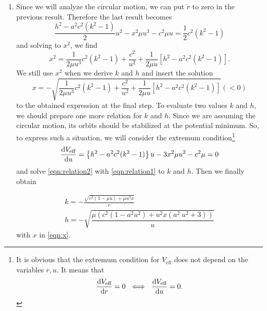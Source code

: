 \documentclass[a4paper,pdftex,10pt]{article}
\begin{document}
\begin{enumerate}
  \item
        Since we will analyze the circular motion, we can put $\dot{r}$ to zero in the previous result. Therefore the last result becomes
        \begin{equation}
          \frac{h^2-a^2c^2(k^2-1)}{2}u^2
          -
          x^2\mu u^3
          -
          c^2\mu u
          =
          \frac{1}{2}c^2(k^2-1)
          \label{eqn:relation1}
        \end{equation}
        and solving to $x^2$, we find
        \begin{equation}
          x^2
          =
          \frac{1}{2\mu u^3}c^2(k^2-1)
          +
          \frac{c^2}{u^2}
          +
          \frac{1}{2\mu u}\left[ h^2-a^2c^2(k^2-1) \right]
          .
        \end{equation}
        We still use $x^2$ when we derive $k$ and $h$ and insert the solution
        \begin{equation}
          x
          =
          -
          \sqrt{
            \frac{1}{2\mu u^3}c^2(k^2-1)
            +
            \frac{c^2}{u^2}
            +
            \frac{1}{2\mu u}\left[ h^2-a^2c^2(k^2-1) \right]
          }
          (<
          0)
          \label{eqn:x}
        \end{equation}
        to the obtained expression at the final step. To evaluate two values $k$ and $h$, we should prepare one more relation for $k$ and $h$. Since we are assuming the circular motion, its orbits should be stabilized at the potential minimum. So, to express such a situation, we will consider the extremum condition\footnote{
          It is obvious that the extremum condition for $V_{\textrm{eff}}$ does not depend on the variables $r, u$. It means that
          $$
            \dv{V_{\textrm{eff}}}{r}
            =
            0
            \ \iff\
            \dv{V_{\textrm{eff}}}{u}
            =
            0
            .
          $$
        }
        \begin{equation}
          \dv{V_{\textrm{eff}}}{u}
          =
          \left\{ h^2-a^2c^2(k^2-1) \right\}u
          -
          3x^2\mu u^2
          -
          c^2\mu
          =
          0
          \label{eqn:relation2}
        \end{equation}
        and solve \eqref{eqn:relation2} with \eqref{eqn:relation1} to $k$ and $h$. Then we finally obtain
        \begin{graybox}
          \vspace*{-5pt}
          \begin{gather}
            k
            =
            -\frac{\sqrt{c^2 (1-\mu  u)+\mu  u^3 x}}{c}
            \label{eqn:k}
            \\
            h
            =
            -
            \sqrt{\dfrac{\mu  \left(c^2 \left(1-a^2 u^2\right)+u^2 x \left(a^2 \
                u^2+3\right)\right)}{u}}
            \label{eqn:h}
          \end{gather}
          with $x$ in \eqref{eqn:x}.
        \end{graybox}
        

\end{enumerate}
\end{document}
